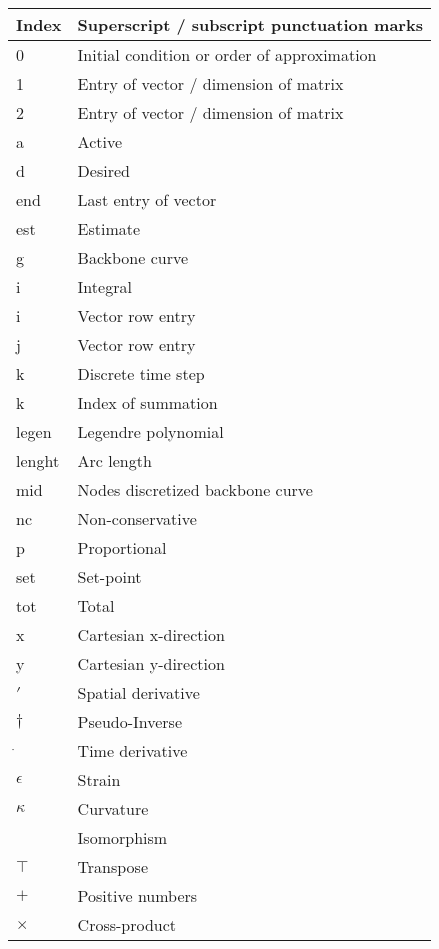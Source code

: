 \begin{spacing}{0.9}
\begin{multicols}{2}
\begin{table}[H]
\centering
    \begin{tabular}{p{1.5cm} p{5cm}} \hline
    \textbf{Index}    &   \textbf{Superscript / subscript punctuation marks}\\ \hline
    0     &  Initial condition or order of approximation \\
    1     &  Entry of vector / dimension of matrix \\
    2     &  Entry of vector / dimension of matrix \\
    a     &  Active \\
    d     &  Desired \\
    end   & Last entry of vector \\
    est   & Estimate \\
    g     & Backbone curve \\
    i     & Integral \\
    i     & Vector row entry \\
    j     & Vector row entry \\
    k     & Discrete time step \\
    k     & Index of summation \\
    legen & Legendre polynomial \\
    lenght & Arc length \\
    mid    & Nodes discretized backbone curve \\
    nc    & Non-conservative \\
    p    & Proportional \\
    set   & Set-point \\
    tot    & Total \\
    x    & Cartesian x-direction \\
    y    & Cartesian y-direction \\
    $'$ & Spatial derivative \\
    $\dagger$ & Pseudo-Inverse \\
    $\dot{}$ & Time derivative \\
    $\epsilon$  & Strain \\
    $\kappa$ & Curvature \\
    $\hat{}$ & Isomorphism \\
    $\top$ & Transpose \\
    $+$ & Positive numbers \\
    $\times$ & Cross-product \\  \hline
    
    \end{tabular}
\end{table}




\end{multicols}
\end{spacing}
